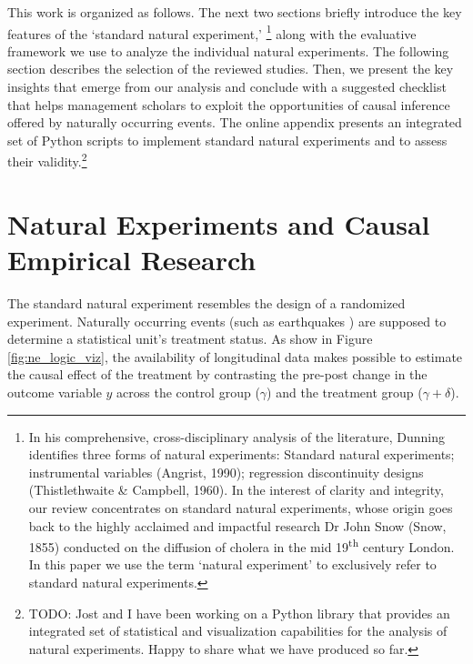 \documentclass[nobib]{tufte-handout}
\newcommand{\todo}[1]{}
\renewcommand{\todo}[1]{{\color{red} TODO: {#1}}}
\begin{document}
\begin{refsection}
This work is organized as follows. The next two sections briefly introduce the
key features of the `standard natural experiment,' \footnote{In his
comprehensive, cross-disciplinary analysis of the literature, Dunning
\citeyear[][]{Dunning2012} identifies three forms of natural experiments:
Standard natural experiments; instrumental variables (Angrist, 1990); regression
discontinuity designs (Thistlethwaite \& Campbell, 1960). In the interest of
clarity and integrity, our review concentrates on standard natural experiments,
whose origin goes back to the highly acclaimed and impactful research Dr John
Snow (Snow, 1855) conducted on the diffusion of cholera in the mid
19\textsuperscript{th} century London. In this paper we use the term `natural
experiment' to exclusively refer to standard natural experiments.} along with
the evaluative framework we use to analyze the individual natural experiments.
The following section describes the selection of the reviewed studies. Then, we
present the key insights that emerge from our analysis and conclude with a
suggested checklist that helps management scholars to exploit the opportunities
of causal inference offered by naturally occurring events. The online appendix
presents an integrated set of Python scripts to implement standard natural
experiments and to assess their validity.\footnote{\todo{Jost and I have been
working on a Python library that provides an integrated set of statistical and
visualization capabilities for the analysis of natural experiments. Happy to
share what we have produced so far.}}

\section{Natural Experiments and Causal Empirical Research}
\label{sec:standard_ne}


The standard natural experiment resembles the
design of a randomized experiment. Naturally occurring events (such
as earthquakes \parencite[e.g.,][]{Belloc2016}) are supposed 
to determine a statistical unit's treatment status. As show in
Figure \ref{fig:ne_logic_viz}, the availability of longitudinal data
makes possible to estimate the causal effect of the treatment by
contrasting the pre-post change in the outcome variable $y$ across
the control group ($\gamma$) and the treatment group 
($ \gamma + \delta$).


\end{refsection}
\end{document}

